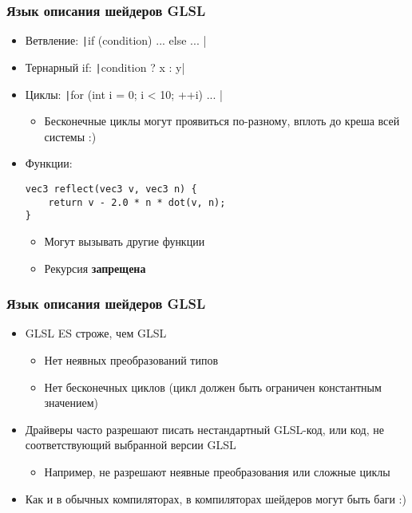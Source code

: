 \documentclass[10pt]{beamer}
\begin{document}
\begin{frame}[fragile]
\frametitle{Язык описания шейдеров GLSL}
\begin{itemize}
\item Ветвление: \texttt|if (condition) { ... } else { ... }|
\pause
\item Тернарный if: \texttt|condition ? x : y|
\pause
\item Циклы: \texttt|for (int i = 0; i < 10; ++i) { ... }|
\begin{itemize}
\item Бесконечные циклы могут проявиться по-разному, вплоть до креша всей системы :)
\end{itemize}
\pause
{}
\item Функции: \begin{verbatim}
vec3 reflect(vec3 v, vec3 n) {
    return v - 2.0 * n * dot(v, n);
}
\end{verbatim}
\pause
\begin{itemize}
\item Могут вызывать другие функции
\pause
\item Рекурсия \alert{\textbf{запрещена}}
\end{itemize}
\end{itemize}
\end{frame}

\begin{frame}[fragile]
\frametitle{Язык описания шейдеров GLSL}
\begin{itemize}
\item GLSL ES строже, чем GLSL
\begin{itemize}
\item Нет неявных преобразований типов
\item Нет бесконечных циклов (цикл должен быть ограничен константным значением)
\end{itemize}
\pause
\item Драйверы часто разрешают писать нестандартный GLSL-код, или код, не соответствующий выбранной версии GLSL
\begin{itemize}
\item Например, не разрешают неявные преобразования или сложные циклы
\end{itemize}
\pause
\item Как и в обычных компиляторах, в компиляторах шейдеров могут быть баги :)
\end{itemize}
\end{frame}
\end{document}
